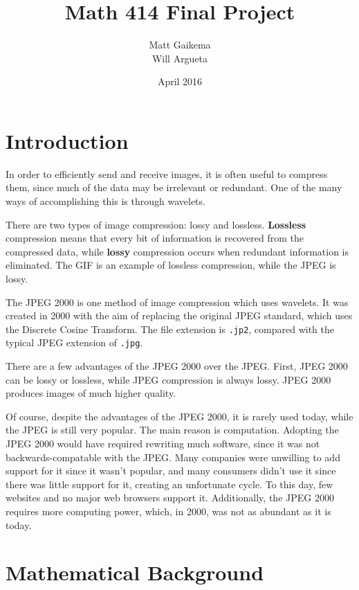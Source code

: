 \documentclass{article}
\title{Math 414 Final Project}
\author{Matt Gaikema \\ Will Argueta}
\date{April 2016}
\begin{document}
\maketitle

\section{Introduction}

In order to efficiently send and receive images, it is often useful to compress them, 
since much of the data may be irrelevant or redundant.
One of the many ways of accomplishing this is through wavelets.

There are two types of image compression: lossy and lossless.
\textbf{Lossless} compression means that every bit of information is recovered from the compressed data,
while \textbf{lossy} compression occurs when redundant information is eliminated.
The GIF is an example of lossless compression, while the JPEG is lossy.

The JPEG 2000 is one method of image compression which uses wavelets.
It was created in 2000 with the aim of replacing the original JPEG standard, 
which uses the Discrete Cosine Transform.
The file extension is \verb|.jp2|, compared with the typical JPEG extension of \verb|.jpg|.

There are a few advantages of the JPEG 2000 over the JPEG.
First, JPEG 2000 can be lossy or lossless, while JPEG compression is always lossy.
JPEG 2000 produces images of much higher quality.

Of course, despite the advantages of the JPEG 2000, it is rarely used today, 
while the JPEG is still very popular.
The main reason is computation. 
Adopting the JPEG 2000 would have required rewriting much software, 
since it was not backwards-compatable with the JPEG.
Many companies were unwilling to add support for it since it wasn't popular,
and many consumers didn't use it since there was little support for it,
creating an unfortunate cycle. 
To this day, few websites and no major web browsers support it.
Additionally, the JPEG 2000 requires more computing power, which,
in 2000, was not as abundant as it is today.


\section{Mathematical Background}
\end{document}

